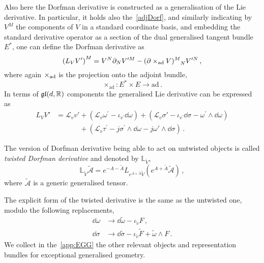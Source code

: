 \documentclass[debug]{phd}
\begin{document}
						Also here the Dorfman derivative is constructed as a generalisation of the Lie derivative. 
						In particular, it holds also the~\eqref{adjDorf}, and similarly indicating by $V^M$ the components of $V$ in a standard coordinate basis, and embedding the standard derivative operator as a section of the dual generalised tangent bundle $E^*$, one can define the Dorfman derivative as
							\begin{equation}\label{dorfMadj}
								\left(L_V V'\right)^M = V^N \partial_N V^{\prime M} - (\partial \times_{\rm ad} V)^M_{\phantom{M}N} V^{\prime N} \, ,
							\end{equation}
						where again $ \times_{\rm ad}$ is the projection onto the adjoint bundle,
								\begin{equation}
									\times_{\mathrm{ad}} : E^* \times E \rightarrow \mathrm{ad}\, . 
								\end{equation}
						In terms of $\mathfrak{gl}(d, \mathbb{R})$ components the generalised Lie derivative can be expressed as
								\begin{equation}\label{dorfM}
									\begin{split}
									L_V V' &= \mathcal{L}_{v} v' + \left(\mathcal{L}_{v} \omega^{\prime} -\iota_{v^\prime}\dd \omega\right) + \left(\mathcal{L}_{v} \sigma' -\iota_{v^\prime}\dd\sigma - \omega^{\prime}\wedge \dd \omega\right) \\
										& \phantom{= \mathcal{L}_{v} v'}+ \left(\mathcal{L}_{v} \tau^{\prime} - j \sigma^{\prime}\wedge \dd \omega - j \omega' \wedge\dd\sigma \right) \, .
									\end{split}
								\end{equation}
						
						The version of Dorfman derivative being able to act on untwisted objects is called \emph{twisted Dorfman derivative} and denoted by $\mathbb{L}_{\tilde{V}}$,
								\begin{equation}
									\mathbb{L}_{\tilde{V}} \tilde{\mathcal{A}} = e^{-A-\tilde{A}}L_{e^{A+\tilde{A}} \tilde{V}} (e^{A+\tilde{A}}\tilde{\mathcal{A}}) \, ,
								\end{equation}
						where $\tilde{\mathcal{A}}$ is a generic generalised tensor.
						
						The explicit form of the twisted derivative is the same as the untwisted one, modulo the following replacements,
								\begin{equation}\label{repruleTwDorf}
									\begin{split}
										\dd \omega	&\rightarrow 	\dd \tilde{\omega} -\iota_{\tilde{v}} F \, , \\
										\dd\sigma 		&\rightarrow	\dd \tilde{\sigma} - \iota_{\tilde{v}} \tilde{F} + \tilde{\omega}\wedge F \, .
									\end{split}
								\end{equation}
						We collect in the~\cref{app:EGG} the other relevant objects and representation bundles for exceptional generalised geometry.
\end{document}
